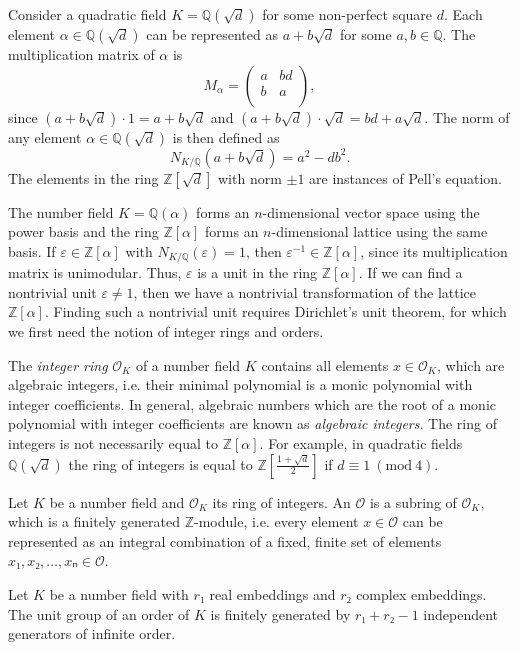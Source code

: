 \begin{example}
  Consider a quadratic field $K = ℚ(\sqrt{d})$ for some non-perfect square $d$.
  Each element $α ∈ ℚ(\sqrt{d})$ can be represented as $a + b \sqrt{d}$ for some $a, b ∈ ℚ$.
  The multiplication matrix of $α$ is
  \[
    M_α =
    \begin{pmatrix}
      a & bd \\
      b & a \\
    \end{pmatrix},
  \]
  since
  $(a + b \sqrt{d}) · 1 = a + b \sqrt{d}$ and
  $(a + b \sqrt{d}) · \sqrt{d} = bd + a \sqrt{d}$.
  The norm of any element $α ∈ ℚ(\sqrt{d})$ is then defined as
  \[
    N_{K/ℚ}(a + b \sqrt{d}) = a^2 - d b^2.
  \]
  The elements in the ring $ℤ[\sqrt{d}]$ with norm $±1$
  are instances of Pell's equation.
\end{example}

The number field $K = ℚ(α)$ forms an $n$-dimensional vector space using the power basis
and the ring $ℤ[α]$ forms an $n$-dimensional lattice using the same basis.
If $ε ∈ ℤ[α]$ with $N_{K/ℚ}(ε) = 1$, then $ε^{-1} ∈ ℤ[α]$,
since its multiplication matrix is unimodular.
Thus, $ε$ is a unit in the ring $ℤ[α]$.
If we can find a nontrivial unit $ε ≠ 1$,
then we have a nontrivial transformation of the lattice $ℤ[α]$.
Finding such a nontrivial unit requires Dirichlet's unit theorem,
for which we first need the notion of integer rings and orders.

The \emph{integer ring} $\mathcal O_K$ of a number field $K$
contains all elements $x ∈ \mathcal O_K$, which are algebraic integers,
i.e. their minimal polynomial is a monic polynomial with integer coefficients.
In general, algebraic numbers which are the root of a monic polynomial with integer coefficients
are known as \emph{algebraic integers}.
The ring of integers is not necessarily equal to $ℤ[α]$.
For example, in quadratic fields $ℚ(\sqrt{d})$
the ring of integers is equal to $ℤ\left[\frac{1+\sqrt{d}}{2}\right]$ if $d ≡ 1\ (\mathrm{mod}\ 4)$.

\begin{definition}
  Let $K$ be a number field and $\mathcal O_K$ its ring of integers.
  An  $\mathcal O$ is a subring of $\mathcal O_K$,
  which is a finitely generated $ℤ$-module,
  i.e. every element $x ∈ \mathcal O$ can be represented as an integral
  combination of a fixed, finite set of elements $x₁, x₂, …, xₙ ∈ \mathcal O$.
\end{definition}

\begin{theorem}
  Let $K$ be a number field with $r₁$ real embeddings and $r₂$ complex embeddings.
  The unit group of an order of $K$ is finitely generated by $r₁ + r₂ - 1$
  independent generators of infinite order.
\end{theorem}

